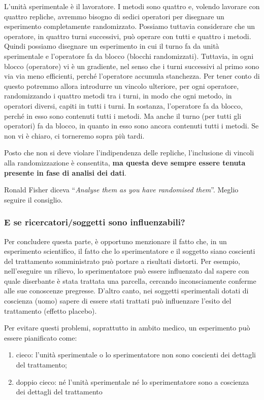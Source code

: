 \documentclass[a4paper,12pt,oneside]{book}
\providecommand{\tightlist}{%
  \setlength{\itemsep}{0pt}\setlength{\parskip}{0pt}}
\theoremstyle{definition}
\theoremstyle{definition}
\theoremstyle{definition}
\theoremstyle{remark}
\begin{document}
L'unità sperimentale è il lavoratore. I metodi sono quattro e, volendo
lavorare con quattro repliche, avremmo bisogno di sedici operatori per
disegnare un esperimento completamente randomizzato. Possiamo tuttavia
considerare che un operatore, in quattro turni successivi, può operare
con tutti e quattro i metodi. Quindi possiamo disegnare un esperimento
in cui il turno fa da unità sperimentale e l'operatore fa da blocco
(blocchi randomizzati). Tuttavia, in ogni blocco (operatore) vi è un
gradiente, nel senso che i turni successivi al primo sono via via meno
efficienti, perché l'operatore accumula stanchezza. Per tener conto di
questo potremmo allora introdurre un vincolo ulteriore, per ogni
operatore, randomizzando i quattro metodi tra i turni, in modo che ogni
metodo, in operatori diversi, capiti in tutti i turni. In sostanza,
l'operatore fa da blocco, perché in esso sono contenuti tutti i metodi.
Ma anche il turno (per tutti gli operatori) fa da blocco, in quanto in
esso sono ancora contenuti tutti i metodi. Se non vi è chiaro, ci
torneremo sopra più tardi.

Posto che non si deve violare l'indipendenza delle repliche,
l'inclusione di vincoli alla randomizzazione è consentita, \textbf{ma
questa deve sempre essere tenuta presente in fase di analisi dei dati}.

Ronald Fisher diceva ``\emph{Analyse them as you have randomised
them}''. Meglio seguire il consiglio.

\subsubsection{E se ricercatori/soggetti sono
influenzabili?}\label{e-se-ricercatorisoggetti-sono-influenzabili}

Per concludere questa parte, è opportuno menzionare il fatto che, in un
esperimento scientifico, il fatto che lo sperimentatore e il soggetto
siano coscienti del trattamento somministrato può portare a risultati
distorti. Per esempio, nell'eseguire un rilievo, lo sperimentatore può
essere influenzato dal sapere con quale diserbante è stata trattata una
parcella, cercando inconsciamente conferme alle sue conoscenze
pregresse. D'altro canto, nei soggetti sperimentali dotati di coscienza
(uomo) sapere di essere stati trattati può influenzare l'esito del
trattamento (effetto placebo).

Per evitare questi problemi, soprattutto in ambito medico, un
esperimento può essere pianificato come:

\begin{enumerate}
\def\labelenumi{\arabic{enumi}.}
\tightlist
\item
  cieco: l'unità sperimentale o lo sperimentatore non sono coscienti dei
  dettagli del trattamento;
\item
  doppio cieco: né l'unità sperimentale né lo sperimentatore sono a
  coscienza dei dettagli del trattamento
\end{enumerate}
\end{document}
